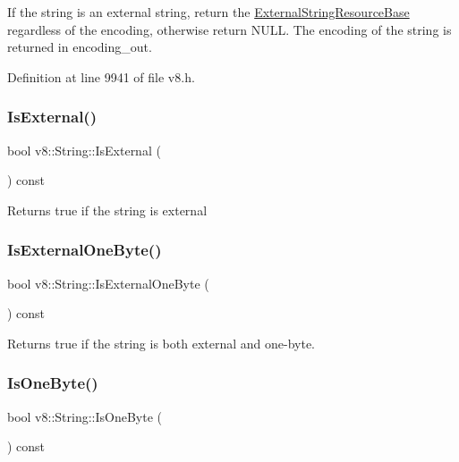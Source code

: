 If the string is an external string, return the \mbox{\hyperlink{classv8_1_1String_1_1ExternalStringResourceBase}{External\+String\+Resource\+Base}} regardless of the encoding, otherwise return N\+U\+LL. The encoding of the string is returned in encoding\+\_\+out. 

Definition at line 9941 of file v8.\+h.

\mbox{\label{classv8_1_1String_a1d24faa97c6168221ec362c395d41ce1}} 
\subsubsection{\texorpdfstring{Is\+External()}{IsExternal()}}
{\footnotesize\ttfamily bool v8\+::\+String\+::\+Is\+External (\begin{DoxyParamCaption}{ }\end{DoxyParamCaption}) const}

Returns true if the string is external \mbox{\label{classv8_1_1String_a29b5d1786d906b84e10a5cab9451f976}} 
\subsubsection{\texorpdfstring{Is\+External\+One\+Byte()}{IsExternalOneByte()}}
{\footnotesize\ttfamily bool v8\+::\+String\+::\+Is\+External\+One\+Byte (\begin{DoxyParamCaption}{ }\end{DoxyParamCaption}) const}

Returns true if the string is both external and one-\/byte. \mbox{\label{classv8_1_1String_a8f14ab3aff52295d2d3245081a1b29eb}} 
\subsubsection{\texorpdfstring{Is\+One\+Byte()}{IsOneByte()}}
{\footnotesize\ttfamily bool v8\+::\+String\+::\+Is\+One\+Byte (\begin{DoxyParamCaption}{ }\end{DoxyParamCaption}) const}

